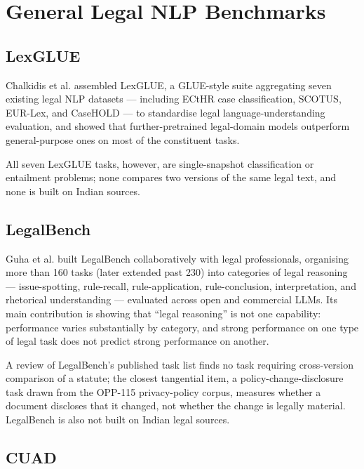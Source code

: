 \section{General Legal NLP Benchmarks}

\label{sec:2-4}

\subsection{LexGLUE}

\label{sec:2-4-1}

Chalkidis et al. \cite{chalkidis2022lexglue} assembled LexGLUE, a GLUE-style suite aggregating seven existing legal NLP datasets — including ECtHR case classification, SCOTUS, EUR-Lex, and CaseHOLD — to standardise legal language-understanding evaluation, and showed that further-pretrained legal-domain models outperform general-purpose ones on most of the constituent tasks.

All seven LexGLUE tasks, however, are single-snapshot classification or entailment problems; none compares two versions of the same legal text, and none is built on Indian sources.

\subsection{LegalBench}

\label{sec:2-4-2}

Guha et al. \cite{guha2023legalbench} built LegalBench collaboratively with legal professionals, organising more than 160 tasks (later extended past 230) into categories of legal reasoning — issue-spotting, rule-recall, rule-application, rule-conclusion, interpretation, and rhetorical understanding — evaluated across open and commercial LLMs. Its main contribution is showing that “legal reasoning” is not one capability: performance varies substantially by category, and strong performance on one type of legal task does not predict strong performance on another.

A review of LegalBench's published task list finds no task requiring cross-version comparison of a statute; the closest tangential item, a policy-change-disclosure task drawn from the OPP-115 privacy-policy corpus, measures whether a document discloses that it changed, not whether the change is legally material. LegalBench is also not built on Indian legal sources.

\subsection{CUAD}

